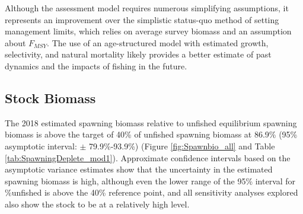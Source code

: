 \documentclass[12pt,]{article}
\begin{document}
Although the assessment model requires numerous simplifying assumptions,
it represents an improvement over the simplistic status-quo method of
setting management limits, which relies on average survey biomass and an
assumption about \(F_{MSY}\). The use of an age-structured model with
estimated growth, selectivity, and natural mortality likely provides a
better estimate of past dynamics and the impacts of fishing in the
future.

\hypertarget{stock-biomass}{%
\subsection*{Stock Biomass}\label{stock-biomass}}

The 2018 estimated spawning biomass relative to unfished equilibrium
spawning biomass is above the target of 40\% of unfished spawning
biomass at 86.9\% (95\% asymptotic interval: \(\pm\) 79.9\%-93.9\%)
(Figure \ref{fig:Spawnbio_all} and Table
\ref{tab:SpawningDeplete_mod1}). Approximate confidence intervals based
on the asymptotic variance estimates show that the uncertainty in the
estimated spawning biomass is high, although even the lower range of the
95\% interval for \%unfished is above the 40\% reference point, and all
sensitivity analyses explored also show the stock to be at a relatively
high level.

\vspace{.5cm}

\FloatBarrier
\end{document}

